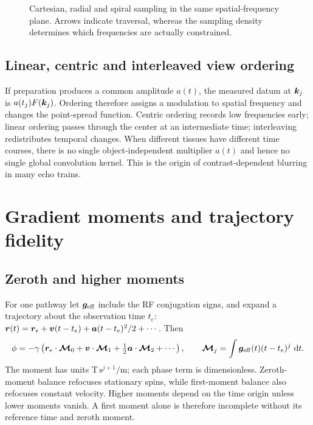 \begin{figure}[tb]
\centering

\caption{Cartesian, radial and spiral sampling in the same spatial-frequency plane. Arrows indicate traversal, whereas the sampling density determines which frequencies are actually constrained.}
\label{fig:05:trajectories}
\end{figure}

\subsection{Linear, centric and interleaved view ordering}
If preparation produces a common amplitude \(a(t)\), the measured datum at \(\bm{k}_j\) is \(a(t_j)F(\bm{k}_j)\). Ordering therefore assigns a modulation to spatial frequency and changes the point-spread function. Centric ordering records low frequencies early; linear ordering passes through the center at an intermediate time; interleaving redistributes temporal changes. When different tissues have different time courses, there is no single object-independent multiplier \(a(t)\) and hence no single global convolution kernel. This is the origin of contrast-dependent blurring in many echo trains.

\section{Gradient moments and trajectory fidelity}
\label{sec:05:gradient-moments-and-trajectory-fidelity}
\subsection{Zeroth and higher moments}
For one pathway let \(\bm{g}_{\mathrm{eff}}\) include the RF conjugation signs, and expand a trajectory about the observation time \(t_e\):
\(\bm{r}(t)=\bm{r}_e+\bm{v}(t-t_e)+\bm{a}(t-t_e)^2/2+\cdots\).
Then
\begin{equation}
 \phi=-\gamma\left(\bm{r}_e\cdot\bm{\mathcal M}_0+
 \bm{v}\cdot\bm{\mathcal M}_1+
 \tfrac12\bm{a}\cdot\bm{\mathcal M}_2+\cdots\right),\qquad
 \bm{\mathcal M}_j=\int\bm{g}_{\mathrm{eff}}(t)(t-t_e)^j\,\mathop{}\!\mathrm{d} t.
 \label{eq:05:moments}
\end{equation}
The moment has units \(\si{\tesla}\,\mathrm{s}^{j+1}/\mathrm m\); each phase term is dimensionless. Zeroth-moment balance refocuses stationary spins, while first-moment balance also refocuses constant velocity. Higher moments depend on the time origin unless lower moments vanish. A first moment alone is therefore incomplete without its reference time and zeroth moment.


